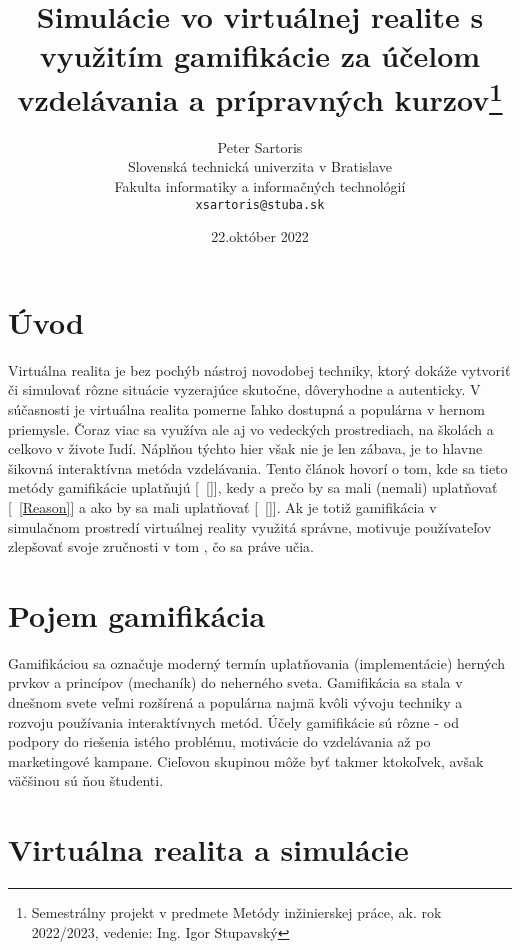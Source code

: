 \documentclass[10pt,slovak,a4paper]{article}
\title{Simulácie vo virtuálnej realite s využitím gamifikácie za účelom vzdelávania a prípravných kurzov\thanks{Semestrálny projekt v predmete Metódy inžinierskej práce, ak. rok 2022/2023, vedenie: Ing. Igor Stupavský}}
\author{Peter Sartoris\\[2pt]
	{\small Slovenská technická univerzita v Bratislave}\\
	{\small Fakulta informatiky a informačných technológií}\\
	{\small \texttt{xsartoris@stuba.sk}}
	}
\date{\small 22.október 2022}
\begin{document}
\maketitle


\section{Úvod} \label{Abstract}

Virtuálna realita je bez pochýb nástroj novodobej techniky, ktorý dokáže vytvoriť či simulovať rôzne situácie vyzerajúce skutočne, dôveryhodne a autenticky.
V súčasnosti je virtuálna realita pomerne ľahko dostupná a populárna v hernom priemysle. Čoraz viac sa využíva ale aj vo vedeckých prostrediach, na školách a celkovo v živote ľudí. 
Náplňou týchto hier však nie je len zábava, je to hlavne šikovná interaktívna metóda vzdelávania.
Tento článok hovorí o tom, kde sa tieto metódy gamifikácie uplatňujú [~\ref{}], kedy a prečo by sa mali (nemali) uplatňovať [~\ref{Reason}] a ako by sa mali uplatňovať [~\ref{}]. 
Ak je totiž gamifikácia v simulačnom prostredí  virtuálnej reality využitá správne, motivuje používateľov zlepšovať svoje zručnosti v tom , čo sa práve učia.


\section{Pojem gamifikácia} \label{Gamification}

Gamifikáciou sa označuje moderný termín uplatňovania (implementácie) herných prvkov a princípov (mechaník) do neherného sveta. Gamifikácia sa stala v dnešnom svete veľmi rozšírená a 
populárna najmä kvôli vývoju techniky a rozvoju používania interaktívnych metód. Účely gamifikácie sú rôzne - od podpory do riešenia istého problému, motivácie do vzdelávania až po
 marketingové kampane. Cieľovou skupinou môže byť takmer ktokoľvek, avšak väčšinou sú ňou študenti. 



\section{Virtuálna realita a simulácie} \label{Simulations}
\end{document}
